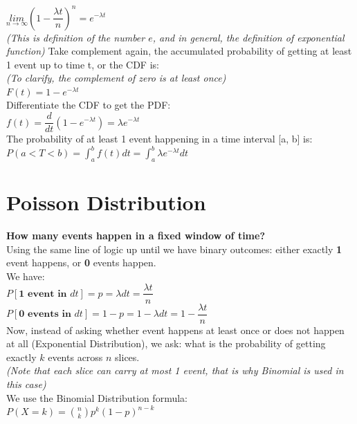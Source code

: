 \documentclass{article}
\begin{document}
$\underset{n\rightarrow \infty}{lim} \left(1 - \dfrac{\lambda t}{n}\right)^n = e^{-\lambda t}$ \\
\textit{(This is definition of the number $e$, and in general, the definition of exponential function)} 
\newpage
Take complement again, the accumulated probability of getting at least 1 event up to time t, or the CDF is: \\
\textit{(To clarify, the complement of zero is at least once)} \\
$F(t) = 1 - e^{-\lambda t}$ \\
Differentiate the CDF to get the PDF: \\
$f(t) = \dfrac{d}{dt}(1 - e^{-\lambda t}) =\lambda e^{-\lambda t}$ \\
The probability of at least 1 event happening in a time interval [a, b] is: \\
$P(a<T<b) = \int_{a}^{b} f(t)dt = \int_{a}^{b}\lambda e^{-\lambda t}dt$

\maketitle

\section{Poisson Distribution}
\textbf{How many events happen in a fixed window of time?} \\

Using the same line of logic up until we have binary outcomes: either exactly \textbf{1} event happens, or \textbf{0} events happen. \\
We have: \\
$P[\textbf{1 event in $dt$}] = p = \lambda dt = \dfrac{\lambda t}{n}$  \\
$P[\textbf{0 events in $dt$}] = 1 - p = 1- \lambda dt = 1 -  \dfrac{\lambda t}{n}$  \\
Now, instead of asking whether event happens at least once or does not happen at all (Exponential Distribution), we ask: what is the probability of getting exactly $k$ events across $n$ slices. \\
\textit{(Note that each slice can carry at most 1 event, that is why Binomial is used in this case)} \\
We use the Binomial Distribution formula: \\
$P(X=k) = \binom{n}{k} p^k(1-p)^{n-k}$ \\
\end{document}
